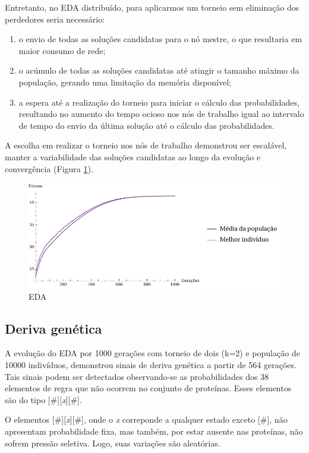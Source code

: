 Entretanto, no EDA distribuído, para aplicarmos um torneio sem eliminação dos perdedores seria necessário:

\begin{enumerate}
	\item o envio de todas as soluções candidatas para o nó mestre, o que resultaria em maior consumo de rede;
	\item o acúmulo de todas as soluções candidatas até atingir o tamanho máximo da população, gerando uma limitação da memória disponível;
	\item a espera até a realização do torneio para iniciar o cálculo das probabilidades, resultando no aumento do tempo ocioso nos nós de trabalho igual ao intervalo de tempo do envio da última solução até o cálculo das probabilidades.
\end{enumerate} 

A escolha em realizar o torneio nos nós de trabalho demonstrou ser escalável, manter a variabilidade das soluções candidatas ao longo da evolução e convergência (Figura \ref{fig:evo_eda}).

\begin{figure}
  \centering
  \includegraphics[width=1\textwidth]{figures/evo_Eda.pdf}
  \caption{EDA}
        \label{fig:evo_eda}
\end{figure}

\subsection{Deriva genética}

A evolução do EDA por 1000 gerações com torneio de dois (k=2) e população de 10000 indivíduos, demonstrou sinais de deriva genética a partir de 564 gerações. Tais sinais podem ser detectados observando-se as probabilidades dos 38 elementos de regra que não ocorrem no conjunto de proteínas. Esses elementos são do tipo [\#][\textit{x}][\#].

O elementos [\#][\textit{x}][\#], onde o \textit{x} correponde a qualquer estado exceto [\#], não apresentam probabilidade fixa, mas também, por estar ausente nas proteínas, não sofrem pressão seletiva. Logo, suas variações são aleatórias.

